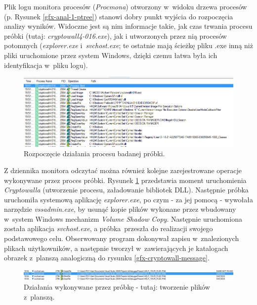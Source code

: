 \documentclass[a4paper,12pt,oneside]{article}
\begin{document}
	Plik logu monitora procesów (\textit{Procmona}) otworzony w~widoku drzewa procesów (p. Rysunek \ref{gfx-anal-1-ptree}) stanowi dobry punkt wyjścia do rozpoczęcia analizy wyników. Widoczne jest są nim informacje takie, jak czas trwania procesu próbki (tutaj: \textit{cryptowall4-016.exe}), jak i utworzonych przez nią procesów potomnych (\textit{explorer.exe} i~\textit{svchost.exe}; te ostatnie mają ścieżkę pliku .exe inną niż pliki uruchomione przez system Windows, dzięki czemu łatwa była ich identyfikacja w~pliku logu).

	\begin{figure}[ht]
		\includegraphics[scale=0.59]{gfx/anal-2-start.PNG}
		\caption{Rozpoczęcie działania procesu badanej próbki.}
		\label{gfx-anal-2-start}
	\end{figure}
	
	Z dziennika monitora odczytać można również kolejne zarejestrowane operacje wykonywane przez proces próbki. Rysunek \ref{gfx-anal-2-start} przedstawia moment uruchomienia \textit{Cryptowalla} (utworzenie procesu, załadowanie bibliotek DLL). Następnie próbka uruchomiła systemową aplikację \textit{explorer.exe}, po czym - za jej pomocą - wywołała narzędzie \textit{vssadmin.exe}, by usunąć kopie plików wykonane przez wbudowany w~system Windows mechanizm \textit{Volume Shadow Copy}. Następnie uruchomiona została aplikacja \textit{svchost.exe}, a próbka~przeszła do realizacji swojego podstawowego celu. Obserwowany program dokonywał zapisu w~znalezionych plikach użytkowników, a następnie tworzył w~zawierających je katalogach obrazek z~planszą analogiczną do rysunku \ref{gfx-cryptowall-message}.
	
	\begin{figure}[ht]
		\includegraphics[scale=0.44]{gfx/anal-3-helpfiles.PNG}
		\caption{Działania wykonywane przez próbkę - tutaj: tworzenie plików z~planszą.}
		\label{gfx-anal-3-scamimg}
	\end{figure}	
	
\end{document}
